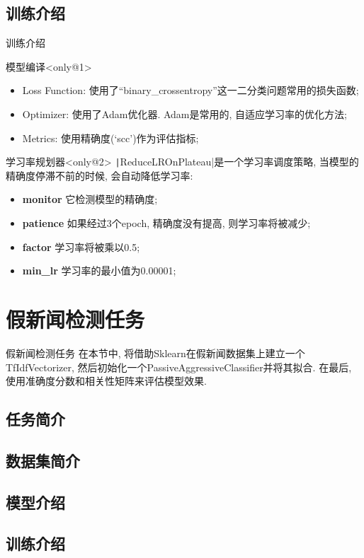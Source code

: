 \documentclass{beamer}
\begin{document}
\subsection{训练介绍}
\begin{frame}[fragile]{训练介绍}
	\begin{block}{模型编译}<only@1>
		\begin{itemize}
			\item Loss Function: 使用了``binary\_crossentropy''这一二分类问题常用的损失函数;
			\item Optimizer: 使用了Adam优化器. Adam是常用的, 自适应学习率的优化方法;
			\item Metrics: 使用精确度(`scc')作为评估指标;
		\end{itemize}
	\end{block}
	\begin{block}{学习率规划器}<only@2>
		\texttt|ReduceLROnPlateau|是一个学习率调度策略, 当模型的精确度停滞不前的时候, 会自动降低学习率:
		\begin{itemize}
			\item \textbf{monitor} 它检测模型的精确度;
			\item \textbf{patience} 如果经过3个epoch, 精确度没有提高, 则学习率将被减少;
			\item \textbf{factor} 学习率将被乘以0.5;
			\item \textbf{min\_lr} 学习率的最小值为0.00001;
		\end{itemize}
	\end{block}
\end{frame}

\section{假新闻检测任务}
\begin{frame}[fragile]{假新闻检测任务}
	在本节中, 将借助Sklearn在假新闻数据集上建立一个TfIdfVectorizer, 然后初始化一个PassiveAggressiveClassifier并将其拟合. 在最后, 使用准确度分数和相关性矩阵来评估模型效果.
\end{frame}
\subsection{任务简介}
\subsection{数据集简介}
\subsection{模型介绍}
\subsection{训练介绍}
\end{document}
